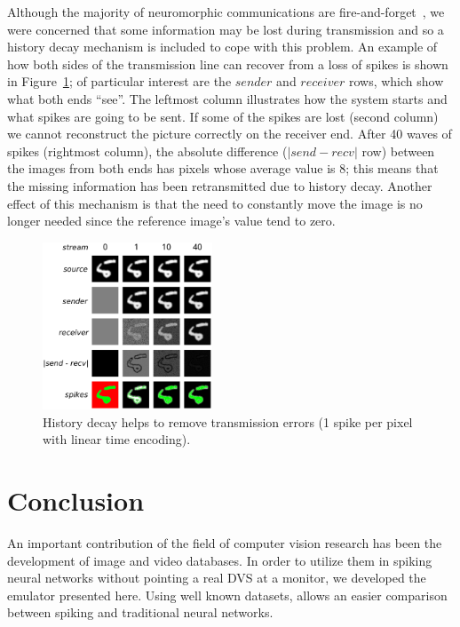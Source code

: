 \documentclass[conference]{IEEEtran}
\begin{document}

Although the majority of neuromorphic communications are fire-and-forget~\cite{Rast2015}, we were concerned that some information may be lost during transmission and so a history decay mechanism is included to cope with this problem. An example of how both sides of the transmission line can recover from a loss of spikes is shown in Figure~\ref{fig:history_decay}; of particular interest are the $sender$ and $receiver$ rows, which show what both ends ``see''. The leftmost column illustrates how the system starts and what spikes are going to be sent. If some of the spikes are lost (second column) we cannot reconstruct the picture correctly on the receiver end. After 40 waves of spikes (rightmost column), the absolute difference ($|send-recv|$ row) between the images from both ends has pixels whose average value is 8; this means that the missing information has been retransmitted due to history decay. Another effect of this mechanism is that the need to constantly move the image is no longer needed since the reference image's value tend to zero.

\begin{figure}[htb]
  \centering
  
  \includegraphics[width=0.45\textwidth]{history_decay}
  \caption{History decay helps to remove transmission errors (1 spike per pixel with linear time encoding).}
  \label{fig:history_decay}
\end{figure}


\section{Conclusion}
\label{sec:conclusions}
An important contribution of the field of computer vision research has been the development of image and video databases. In order to utilize them in spiking neural networks without pointing a real DVS at a monitor, we developed the emulator presented here. Using well known datasets, allows an easier comparison between spiking and traditional neural networks.
\end{document}
